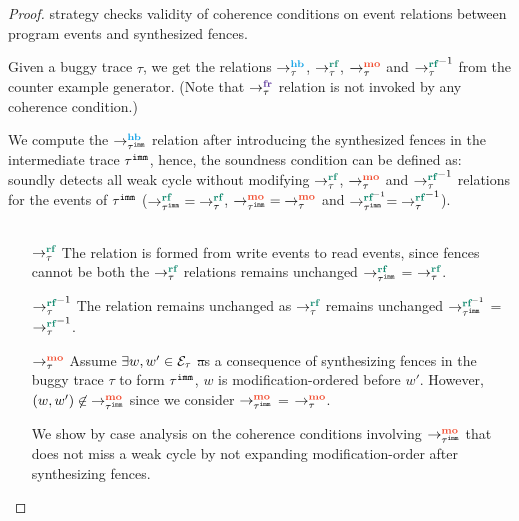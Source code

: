 {}
\begin{proof}
	\wkfence strategy checks validity of coherence conditions
	on event relations between program events and synthesized
	fences.
	
	Given a buggy trace $\tau$, we get the relations $\setHB$,
	$\setRF$, $\setMO$ and $\setRF^{-1}$ from the counter
	example generator.
	(Note that $\setFR$ relation is not invoked by any 
	coherence condition.)
	
	We compute the $\hb{\imm{\tau}}{}{}$ relation after introducing 
	the synthesized fences in the intermediate trace ${\tau}^{\mathtt{imm}}$, 
	hence, the soundness condition can be defined as: 
	\ourtechnique soundly detects all weak cycle without modifying 
	$\setRF$, $\setMO$ and $\setRF^{-1}$ relations for the events of 
	${\tau}^{\mathtt{imm}}$ (\ie $\rf{\imm{\tau}}{}{} = \setRF$, 
	$\mo{\imm{\tau}}{}{} = \setMO$ and $\rfinv{\imm{\tau}}{}{} = 
	\setRF^{-1}$).
	
	\begin{figure}[h]
		\begin{tabular}{|c|c|c|c|}
			\hline
			\resizebox{0.19\textwidth}{!}{} &
			\resizebox{0.25\textwidth}{!}{} &
			\resizebox{0.25\textwidth}{!}{} &
			\resizebox{0.27\textwidth}{!}{} \\
			\hline
		\end{tabular}
		\label{fig:como}
	\end{figure}
	
	
	\begin{itemize}[label=setmm,align=left,leftmargin=*]
		\item [$\setRF$] The relation is formed from write events 
			to read events, since fences cannot be both the $\setRF$
			relations remains unchanged \ie $\rf{\imm{\tau}}{}{}$ =
			$\setRF$.
		
		\item [$\setRF^{-1}$] The relation remains unchanged as 
			$\setRF$ remains unchanged \ie $\rfinv{\imm{\tau}}{}{}$ 
			= $\setRF^{-1}$.
		
		\item [$\setMO$] Assume $\exists w, w' \in \mathcal{E}_\tau$ \st 
			as a consequence of synthesizing fences in the buggy trace 
			$\tau$ to form ${\tau}^{\mathtt{imm}}$, $w$ is modification-ordered
			before $w'$. However, $(w,w') \nin \mo{\imm{\tau}}{}{}$
			since we consider $\mo{\imm{\tau}}{}{}$ = $\setMO$.
			
			We show by case analysis on the coherence conditions
			involving $\mo{\imm{\tau}}{}{}$ that \ourtechnique does
			not miss a weak cycle by not expanding modification-order
			after synthesizing fences.
		

\end{itemize}
\end{proof}
